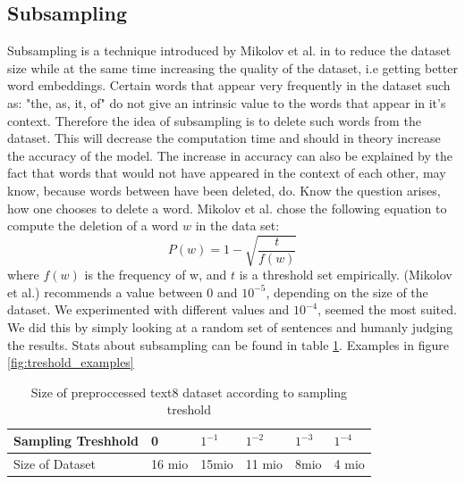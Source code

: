 \subsection{Subsampling}
Subsampling is a technique introduced by Mikolov et al. in \cite{mikolov} to reduce the dataset size while at the same time increasing the quality of the dataset, i.e getting better word embeddings. Certain words that appear very frequently in the dataset such as: "the, as, it, of" do not give an intrinsic value to the words that appear in it's context. Therefore the idea of subsampling is to delete such words from the dataset. This will decrease the computation time and should in theory increase the accuracy of the model. The increase in accuracy can also be explained by the fact that words that would not have appeared in the context of each other, may know, because words between have been deleted, do.
Know the question arises, how one chooses to delete a word. Mikolov et al. chose the following equation to compute the deletion of a word $w$ in the data set:
\begin{equation}
P(w) = 1- \sqrt{{\frac{t}{f(w)}}}
\end{equation}
where $f(w)$ is the frequency of w, and $t$ is a threshold set empirically. (Mikolov et al.)  recommends a value between $0$ and $10^{-5}$, depending on the size of the dataset. We experimented with different values and $10^{-4}$, seemed the most suited. We did this by simply looking at a random set of sentences and humanly judging the results. Stats about subsampling can be found in table \ref{table:treshold}. Examples in figure \ref{fig:treshold_examples}

\begin{table}[h]
\centering
\begin{tabular}{|l|l|l|l|l|l|}
\hline
Sampling Treshhold &  0      &      $ 1^{-1}$&$   1^{-2}$& $1^{-3}     $ &$1^{-4}   $    \\ \hline
Size of Dataset    & 16 mio & 15mio & 11 mio & 8mio & 4 mio \\ \hline
\end{tabular}
\caption{Size of preproccessed text8 dataset according to sampling treshold}
\label{table:treshold}
\end{table}

